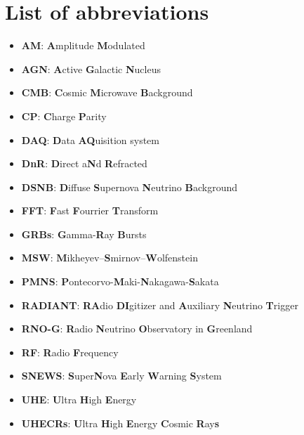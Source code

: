\appendix
\chapter{List of abbreviations}
\begin{itemize}
\item \textbf{AM}: \textbf{A}mplitude \textbf{M}odulated
\item \textbf{AGN}: \textbf{A}ctive \textbf{G}alactic \textbf{N}ucleus
\item \textbf{CMB}: \textbf{C}osmic \textbf{M}icrowave \textbf{B}ackground
\item \textbf{CP}: \textbf{C}harge \textbf{P}arity
\item \textbf{DAQ}: \textbf{D}ata \textbf{AQ}uisition system
\item \textbf{DnR}: \textbf{D}irect a\textbf{N}d \textbf{R}efracted
\item \textbf{DSNB}: \textbf{D}iffuse \textbf{S}upernova \textbf{N}eutrino \textbf{B}ackground
\item \textbf{FFT}: \textbf{F}ast \textbf{F}ourrier \textbf{T}ransform
\item \textbf{GRBs}: \textbf{G}amma-\textbf{R}ay \textbf{B}ursts
\item \textbf{MSW}: \textbf{M}ikheyev–\textbf{S}mirnov–\textbf{W}olfenstein
\item \textbf{PMNS}: \textbf{P}ontecorvo-\textbf{M}aki-\textbf{N}akagawa-\textbf{S}akata
\item \textbf{RADIANT}: \textbf{RA}dio \textbf{DI}gitizer and \textbf{A}uxiliary \textbf{N}eutrino \textbf{T}rigger
\item \textbf{RNO-G}: \textbf{R}adio \textbf{N}eutrino \textbf{O}bservatory in \textbf{G}reenland
\item \textbf{RF}: \textbf{R}adio \textbf{F}requency
\item \textbf{SNEWS}: \textbf{S}uper\textbf{N}ova \textbf{E}arly \textbf{W}arning \textbf{S}ystem
\item \textbf{UHE}: \textbf{U}ltra \textbf{H}igh \textbf{E}nergy 
\item \textbf{UHECRs}: \textbf{U}ltra \textbf{H}igh \textbf{E}nergy \textbf{C}osmic \textbf{R}ay\textbf{s}
\end{itemize}
